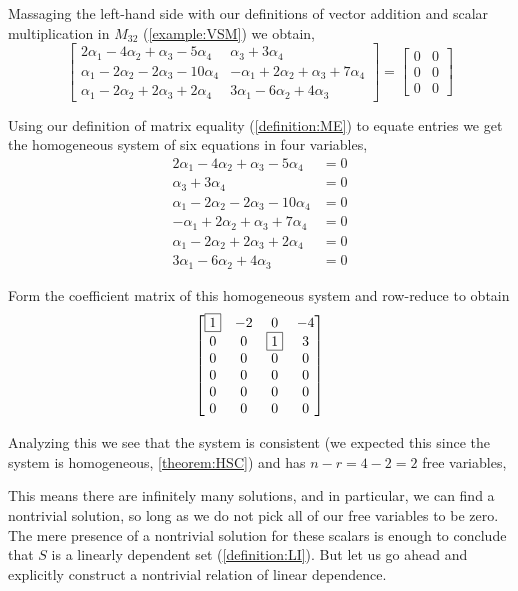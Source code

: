 \documentclass{ximera}
\begin{document}
\begin{example}
  Massaging the left-hand side with our definitions of vector addition and scalar multiplication in $M_{32}$ (\ref{example:VSM}) we obtain,
  \[
    \begin{bmatrix}
      2\alpha_1-4\alpha_2+\alpha_3-5\alpha_4&
      \alpha_3+3\alpha_4\\
      \alpha_1-2\alpha_2-2\alpha_3-10\alpha_4&
      -\alpha_1+2\alpha_2+\alpha_3+7\alpha_4\\
      \alpha_1-2\alpha_2+2\alpha_3+2\alpha_4&
      3\alpha_1-6\alpha_2+4\alpha_3
    \end{bmatrix}
    =\begin{bmatrix}
      0&0\\0&0\\0&0
    \end{bmatrix}
  \]

  Using our definition of matrix equality (\ref{definition:ME}) to equate entries we get the homogeneous system of six equations in four variables,
  \begin{align*}
    2\alpha_1-4\alpha_2+\alpha_3-5\alpha_4&=0\\
    \alpha_3+3\alpha_4&=0\\
    \alpha_1-2\alpha_2-2\alpha_3-10\alpha_4&=0\\
    -\alpha_1+2\alpha_2+\alpha_3+7\alpha_4&=0\\
    \alpha_1-2\alpha_2+2\alpha_3+2\alpha_4&=0\\
    3\alpha_1-6\alpha_2+4\alpha_3         &=0
  \end{align*}

  Form the coefficient matrix of this homogeneous system and row-reduce to obtain
  \[
    \begin{bmatrix}
      \fbox{1} & -2 & 0 & -4\\
      0 & 0 & \fbox{1} & 3\\
      0 & 0 & 0 & 0\\
      0 & 0 & 0 & 0\\
      0 & 0 & 0 & 0\\
      0 & 0 & 0 & 0
    \end{bmatrix}
  \]

  Analyzing this we see that the system is consistent (we expected
  this since the system is homogeneous, \ref{theorem:HSC}) and has
  $n-r=4-2=2$ free variables, 
  \begin{multipleChoice}
  \end{multipleChoice}
  This means there are infinitely many solutions, and in particular,
  we can find a nontrivial solution, so long as we do not pick all of
  our free variables to be zero.  The mere presence of a nontrivial
  solution for these scalars is enough to conclude that $S$ is a
  linearly dependent set (\ref{definition:LI}).  But let us go ahead
  and explicitly construct a nontrivial relation of linear dependence.


\end{example}
\end{document}
